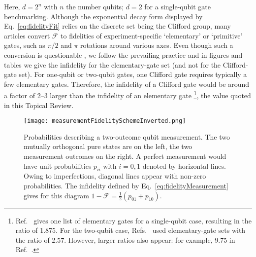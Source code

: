 \documentclass[aps, prx, showpacs, twocolumn, superscriptaddress, notitlepage, longbibliography, floatfix, nofootinbib]{revtex4-2}
\begin{document}
Here, $d=2^n$ with $n$ the number qubits; $d=2$ for a single-qubit gate benchmarking. Although the exponential decay form displayed by Eq.~\eqref{eq:fidelityFit} relies on the discrete set being the Clifford group, many articles convert $\mathcal{F}$ to fidelities of experiment-specific `elementary' or `primitive' gates, such as $\pi/2$ and $\pi$ rotations around various axes. Even though such a conversion is questionable \cite{magesan_characterizing_2012}, we follow the prevailing practice and in figures and tables we give the infidelity for the elementary-gate set (and not for the Clifford-gate set). For one-qubit or two-qubit gates, one Clifford gate requires typically a few elementary gates. Therefore, the infidelity of a Clifford gate would be around a factor of 2--3 larger than the infidelity of an elementary gate \footnote{Ref.~\cite{epstein_investigating_2014} gives one list of elementary gates for a single-qubit case, resulting in the ratio of 1.875. For the two-qubit case, Refs.~\cite{huang_fidelity_2019, petit_universal_2020} used elementary-gate sets with the ratio of 2.57. However, larger ratios also appear: for example, 9.75 in Ref.~\cite{xue_benchmarking_2019}.}, the value quoted in this Topical Review. 

\begin{figure}
  \texttt{[image: measurementFidelitySchemeInverted.png]} \hfill
  \caption{\label{fig:measurementScheme}
  Probabilities describing a two-outcome qubit measurement. The two mutually orthogonal pure states are on the left, the two measurement outcomes on the right. A perfect measurement would have unit probabilities $p_{ii}$ with $i=0,1$ denoted by horizontal lines. Owing to imperfections, diagonal lines appear with non-zero probabilities. The infidelity defined by Eq.~\eqref{eq:fidelityMeasurement} gives for this diagram $1-\mathcal{F} =\frac{1}{2} (p_{01}+p_{10})$.}
\end{figure}
\end{document}
